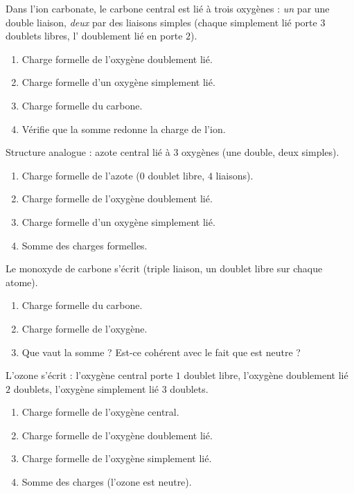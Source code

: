 \documentclass[11pt,a4paper]{article}
\begin{document}
\begin{exo}
Dans l'ion carbonate, le carbone central est lié à trois oxygènes : \emph{un} par une double
liaison, \emph{deux} par des liaisons simples (chaque  simplement lié porte $3$ doublets
libres, l' doublement lié en porte $2$).
\begin{enumerate}[label=\alph*)]
  \item Charge formelle de l'oxygène doublement lié.
  \item Charge formelle d'un oxygène simplement lié.
  \item Charge formelle du carbone.
  \item Vérifie que la somme redonne la charge de l'ion.
\end{enumerate}
\end{exo}

\begin{exo}
Structure analogue : azote central lié à $3$ oxygènes (une double, deux simples).
\begin{enumerate}[label=\alph*)]
  \item Charge formelle de l'azote ($0$ doublet libre, $4$ liaisons).
  \item Charge formelle de l'oxygène doublement lié.
  \item Charge formelle d'un oxygène simplement lié.
  \item Somme des charges formelles.
\end{enumerate}
\end{exo}

\begin{exo}
Le monoxyde de carbone s'écrit  (triple liaison, un doublet libre sur chaque atome).
\begin{enumerate}[label=\alph*)]
  \item Charge formelle du carbone.
  \item Charge formelle de l'oxygène.
  \item Que vaut la somme ? Est-ce cohérent avec le fait que  est neutre ?
\end{enumerate}
\end{exo}

\begin{exo}[l'ozone \ce{O3}]
L'ozone s'écrit  : l'oxygène central porte $1$ doublet libre, l'oxygène doublement lié
$2$ doublets, l'oxygène simplement lié $3$ doublets.
\begin{enumerate}[label=\alph*)]
  \item Charge formelle de l'oxygène central.
  \item Charge formelle de l'oxygène doublement lié.
  \item Charge formelle de l'oxygène simplement lié.
  \item Somme des charges (l'ozone est neutre).
\end{enumerate}
\end{exo}
\end{document}
